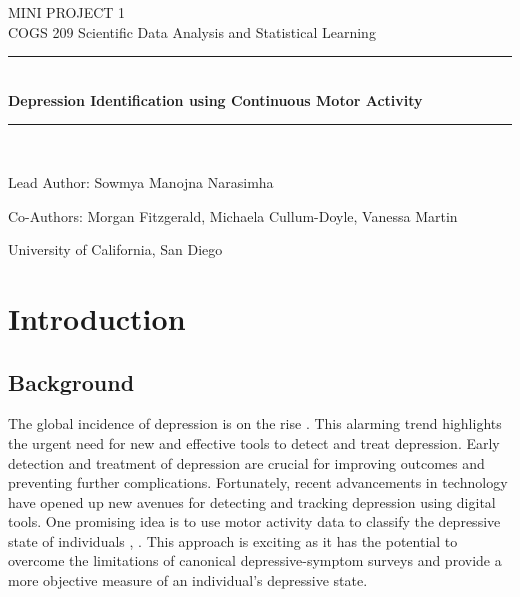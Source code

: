 \documentclass[11pt,a4paper]{article}
\begin{document}
	\begin{titlepage} 
		\begin{center}
		\large{MINI PROJECT 1}\\
		\large {COGS 209 Scientific Data Analysis and Statistical Learning}
		\vspace{3em}
		
		\rule{0.9\linewidth}{0.5mm} \\[0.4cm]
	    {\Large{\bfseries{Depression Identification using Continuous Motor Activity}}} \\
	    \rule{0.9\linewidth}{0.5mm} \\[3 em]	
	    
	    \vspace{5em}

	    Lead Author: Sowmya Manojna Narasimha\\

	    \vspace{1em}

	    Co-Authors: Morgan Fitzgerald, Michaela Cullum-Doyle, Vanessa Martin\\

		\vspace{25em}

		University of California, San Diego
		
		\vspace{5em}    
	    
		\end{center}
	\end{titlepage}

{\hypersetup{linkcolor=black}
 \tableofcontents}
\break

\section{Introduction}
\subsection{Background}
The global incidence of depression is on the rise \cite{marrie2019rising}. This alarming trend highlights the urgent need for new and effective tools to detect and treat depression. Early detection and treatment of depression are crucial for improving outcomes and preventing further complications. Fortunately, recent advancements in technology have opened up new avenues for detecting and tracking depression using digital tools. One promising idea is to use motor activity data to classify the depressive state of individuals \cite{aminifar2021monitoring}, \cite{garcia2018depresjon}. This approach is exciting as it has the potential to overcome the limitations of canonical depressive-symptom surveys and provide a more objective measure of an individual's depressive state.\\
\end{document}

